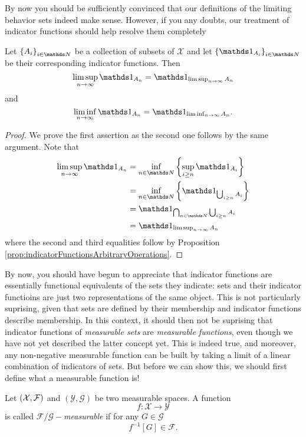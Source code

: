 By now you should be sufficiently convinced that our definitions of
the limiting behavior sets indeed make sense. However, if you any
doubts, our treatment of indicator functions should help resolve them
completely
\begin{prop}
\label{prop:limSupInfIndicator}Let $\left\{ A_{i}\right\} _{i\in\N}$
be a collection of subsets of $\mathcal{X}$ and let $\left\{ \indicate_{A_{i}}\right\} _{i\in\N}$
be their corresponding indicator functions. Then
\[
\limsup_{n\to\infty}\indicate_{A_{n}}=\indicate_{\limsup_{n\to\infty}A_{n}}
\]
and
\[
\liminf_{n\to\infty}\indicate_{A_{n}}=\indicate_{\liminf_{n\to\infty}A_{n}}.
\]
\end{prop}

\begin{proof}
We prove the first assertion as the second one follows by the same
argument. Note that
\begin{align*}
\limsup_{n\to\infty}\indicate_{A_{n}} & =\inf_{n\in\N}\left\{ \sup_{i\geq n}\indicate_{A_{i}}\right\} \\
 & =\inf_{n\in\N}\left\{ \indicate_{\bigcup_{i\geq n}A_{i}}\right\} \\
 & =\indicate_{\bigcap_{n\in\N}\bigcup_{i\geq n}A_{i}}\\
 & =\indicate_{\limsup_{n\to\infty}A_{n}}
\end{align*}
where the second and third equalities follow by Proposition \ref{prop:indicatorFunctionsArbitraryOperations}.
\end{proof}
By now, you should have begun to appreciate that indicator functions
are essentially functional equivalents of the sets they indicate:
sets and their indicator functioins are just two representations of
the same object. This is not particularly suprising, given that sets
are defined by their membership and indicator functions describe membership.
In this context, it should then not be suprising that indicator functions
of \emph{measurable sets }are \emph{measurable functions},\emph{ }even
though we have not yet described the latter concept yet. This is indeed
true, and moreover, any non-negative measurable function can be built
by taking a limit of a linear combination of indicators of sets. But
before we can show this, we should first define what a measurable
function is!
\begin{defn}
\label{def:measurableFunction}Let $\left(\mathcal{X},\mathcal{F}\right)$
and $\left(\mathcal{Y},\mathcal{G}\right)$ be two measurable spaces.
A function 
\[
f:\mathcal{X}\longrightarrow\mathcal{Y}
\]
is called \emph{$\mathcal{F}/\mathcal{G}-$measurable }if for any
$G\in\mathcal{G}$
\[
f^{-1}\left[G\right]\in\mathcal{F}.
\]
\end{defn}


